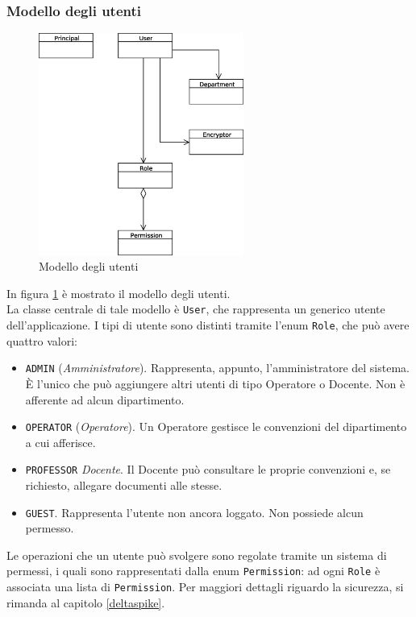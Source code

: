 \subsubsection{Modello degli utenti}

\begin{figure}[h]
	\centering
	\includegraphics[width=0.6\textwidth]{user_model.eps}
	\caption{Modello degli utenti}
	\label{user_model}
\end{figure}

In figura \ref{user_model} è mostrato il modello degli utenti. \\
La classe centrale di tale modello è \texttt{User}, che rappresenta un generico utente dell'applicazione. I tipi di utente sono distinti tramite l'enum \texttt{Role}, che può avere quattro valori:

\begin{itemize}
\item \texttt{ADMIN} (\textsl{Amministratore}). Rappresenta, appunto, l'amministratore del sistema. È l'unico che può aggiungere altri utenti di tipo Operatore o Docente. Non è afferente ad alcun dipartimento.
\item \texttt{OPERATOR} (\textsl{Operatore}). Un Operatore gestisce le convenzioni del dipartimento a cui afferisce.
\item \texttt{PROFESSOR} \textsl{Docente}. Il Docente può consultare le proprie convenzioni e, se richiesto, allegare documenti alle stesse.
\item \texttt{GUEST}. Rappresenta l'utente non ancora loggato. Non possiede alcun permesso.
\end{itemize}

Le operazioni che un utente può svolgere sono regolate tramite un sistema di permessi, i quali sono rappresentati dalla enum \texttt{Permission}: ad ogni \texttt{Role} è associata una lista di \texttt{Permission}. Per maggiori dettagli riguardo la sicurezza, si rimanda al capitolo \ref{deltaspike}.\\


